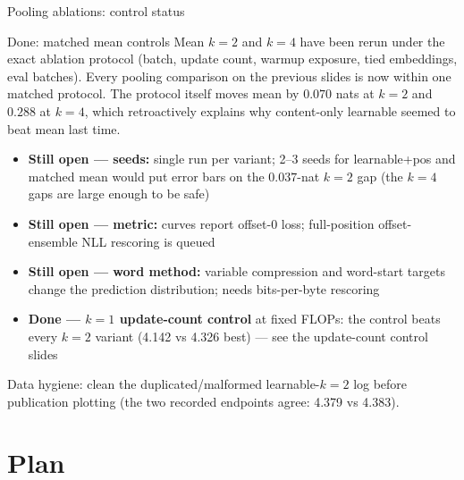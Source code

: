 \documentclass[10pt,aspectratio=169]{beamer}
\newcommand{\good}[1]{\textcolor{okgreen}{#1}}
\newcommand{\bad}[1]{\textcolor{warnred}{#1}}
\begin{document}
\begin{frame}{Pooling ablations: control status}
  \small
  \begin{block}{\good{Done: matched mean controls}}
    Mean $k{=}2$ and $k{=}4$ have been rerun under the exact ablation protocol
    (batch, update count, warmup exposure, tied embeddings, eval batches).
    Every pooling comparison on the previous slides is now within one matched
    protocol. The protocol itself moves mean by $0.070$ nats at $k{=}2$ and
    $0.288$ at $k{=}4$, which retroactively explains why content-only
    learnable seemed to beat mean last time.
  \end{block}

  \begin{itemize}
    \item \textbf{Still open --- seeds:} single run per variant; 2--3 seeds
          for learnable+pos and matched mean would put error bars on the
          $0.037$-nat $k{=}2$ gap (the $k{=}4$ gaps are large enough to be
          safe)
    \item \textbf{Still open --- metric:} curves report offset-0 loss;
          full-position offset-ensemble NLL rescoring is queued
    \item \textbf{Still open --- word method:} variable compression and
          word-start targets change the prediction distribution; needs
          bits-per-byte rescoring
    \item \good{\textbf{Done --- $k{=}1$ update-count control}} at fixed
          FLOPs: the control \bad{beats every $k{=}2$ variant} (4.142 vs
          4.326 best) --- see the update-count control slides
  \end{itemize}

  \tiny Data hygiene: clean the duplicated/malformed learnable-$k{=}2$
  log before publication plotting (the two recorded endpoints agree:
  4.379 vs 4.383).
\end{frame}

\section{Plan}
\end{document}
